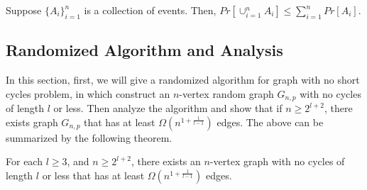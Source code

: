\begin{lemma}\label{union}
Suppose $\{A_i\}_{i=1}^n$ is a collection of events. Then, $Pr[\cup_{i=1}^{n}A_i]\le\sum_{i=1}^{n}Pr[A_i]$.
\end{lemma}
\subsection {Randomized Algorithm and Analysis}
In this section, first, we will give a randomized algorithm for graph with no short cycles problem, in which construct an $n$-vertex random graph $G_{n,p}$ with no cycles of length $l$ or less. Then analyze the algorithm and show that if $n\ge 2^{l+2}$, there exists graph $G_{n,p}$ that has at least $\Omega (n^{1+\frac{1}{l-1}})$ edges. The above can be summarized by the following theorem.
\begin{theorem}
For each $l\ge 3$, and $n\ge 2^{l+2}$, there exists an $n$-vertex graph with no cycles of length $l$ or less that has at least $\Omega (n^{1+\frac{1}{l-1}})$ edges.
\end{theorem}
